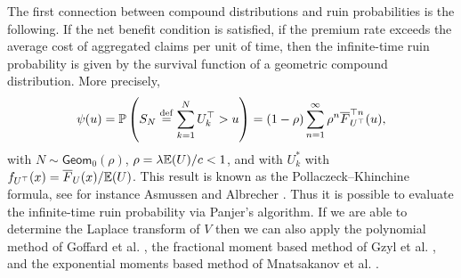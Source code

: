 The first connection between compound distributions and ruin probabilities is the following.
If the net benefit condition is satisfied, \ie if the premium rate exceeds the average cost of aggregated claims per unit of time, then the infinite-time ruin probability is given by the survival function of a geometric compound distribution. More precisely,
\begin{equation*}\label{eq:PollaczeckKhinchineFormula}
\psi(u) = \mathbb P\left(S_N \overset{\mathrm{def}}{=} \sum_{k=1}^{N}U^\top_{k}>u\right)
= (1 - \rho) \sum_{n=1}^\infty \rho^n \overline{F}_{U^\top}^{\top n}(u),
\end{equation*}
with $N \sim \mathsf{Geom}_0(\rho)$, $\rho = \lambda\mathbb E(U)/c<1$, and with \iid $U^\ast_{k}$ with \pdf $f_{U^\top}(x)= \overline{F}_U(x) / \mathbb E(U)$. This result is known as the Pollaczeck--Khinchine formula, see for instance Asmussen and Albrecher \cite[Chapter IV, (2.2)]{asmussen2010ruin}. Thus it is possible to evaluate the infinite-time ruin probability via Panjer's algorithm. If we are able to determine the Laplace transform of $V$ then we can also apply the polynomial method of Goffard et al. \cite{GoLoPo15}, the fractional moment based method of Gzyl et al. \cite{GzNITa13}, and the exponential moments based method of Mnatsakanov et al. \cite{Mnatsakanov2015}.

